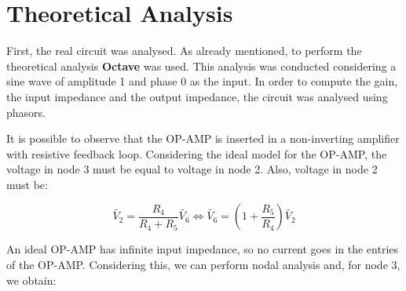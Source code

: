 \newpage
\section{Theoretical Analysis}
\label{sec:analysis}



First, the real circuit was analysed. As already mentioned, to perform the theoretical analysis {\bf Octave} was used. This analysis was conducted considering a sine wave of amplitude 1 and phase 0 as the input. In order to compute the gain, the input impedance and the output impedance, the circuit was analysed using phasors.

It is possible to observe that the OP-AMP is inserted in a non-inverting amplifier with resistive feedback loop. Considering the ideal model for the OP-AMP, the voltage in node 3 must be equal to voltage in node 2. Also, voltage in node 2 must be:

\begin{equation}
        \widetilde{V_2} = \frac{R_4}{R_4+R_5}\widetilde{V_6} \iff \widetilde{V_6} = (1+\frac{R_5}{R_4})\widetilde{V_2}
\end{equation}

An ideal OP-AMP has infinite input impedance, so no current goes in the entries of the OP-AMP. Considering this, we can perform nodal analysis and, for node 3, we obtain: 

